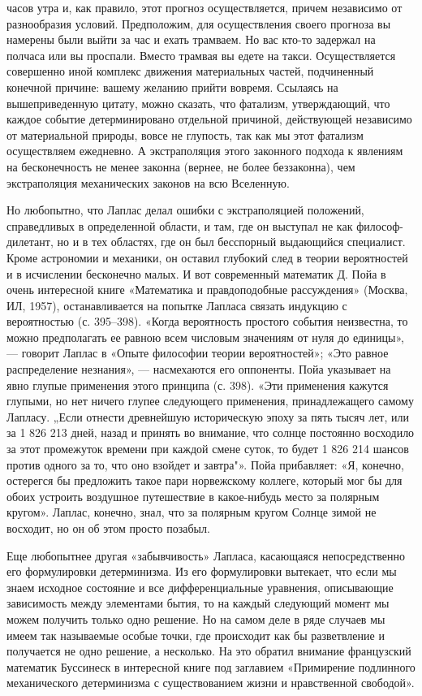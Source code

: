 часов  утра  и,  как  правило,  этот  прогноз  осуществляется,  причем
независимо  от разнообразия  условий.  Предположим, для  осуществления
своего прогноза вы намерены были выйти за час и ехать трамваем. Но вас
кто-то задержал на полчаса или вы проспали. Вместо трамвая вы едете на
такси. Осуществляется  совершенно иной комплекс  движения материальных
частей, подчиненный  конечной причине: вашему желанию  прийти вовремя.
Ссылаясь  на  вышеприведенную  цитату, можно  сказать,  что  фатализм,
утверждающий, что  каждое событие детерминировано  отдельной причиной,
действующей независимо от материальной природы, вовсе не глупость, так
как  мы этот  фатализм осуществляем  ежедневно. А  экстраполяция этого
законного  подхода  к  явлениям  на  бесконечность  не  менее  законна
(вернее, не более беззаконна),  чем экстраполяция механических законов
на всю Вселенную.

Но  любопытно, что  Лаплас  делал ошибки  с экстраполяцией  положений,
справедливых  в  определенной  области,  и там,  где  он  выступал  не
как  философ-дилетант, но  и в  тех  областях, где  он был  бесспорный
выдающийся  специалист.  Кроме  астрономии   и  механики,  он  оставил
глубокий след в теории вероятностей и в исчислении бесконечно малых. И
вот современный математик Д. Пойа в очень интересной книге «Математика
и правдоподобные  рассуждения» (Москва, ИЛ, 1957),  останавливается на
попытке Лапласа связать индукцию  с вероятностью (с. 395--398). «Когда
вероятность  простого события  неизвестна,  то  можно предполагать  ее
равною всем числовым значениям от нуля до единицы», --- говорит Лаплас
в  «Опыте философии  теории вероятностей»;  «Это равное  распределение
незнания»,  ---  насмехаются его  оппоненты.  Пойа  указывает на  явно
глупые  применения этого  принципа (с.  398). «Эти  применения кажутся
глупыми, но  нет ничего  глупее следующего  применения, принадлежащего
самому Лапласу.  „Если отнести  древнейшую историческую эпоху  за пять
тысяч лет,  или за 1  826 213 дней, назад  и принять во  внимание, что
солнце постоянно восходило за этот промежуток времени при каждой смене
суток, то будет 1 826 214 шансов  против одного за то, что оно взойдет
и  завтра"». Пойа  прибавляет:  «Я, конечно,  остерегся бы  предложить
такое  пари норвежскому  коллеге, который  мог бы  для обоих  устроить
воздушное  путешествие  в  какое-нибудь  место  за  полярным  кругом».
Лаплас,  конечно,  знал,  что  за  полярным  кругом  Солнце  зимой  не
восходит, но он об этом просто позабыл.

Еще    любопытнее    другая   «забывчивость»    Лапласа,    касающаяся
непосредственно  его формулировки  детерминизма.  Из его  формулировки
вытекает, что если мы знаем  исходное состояние и все дифференциальные
уравнения,  описывающие  зависимость  между элементами  бытия,  то  на
каждый следующий момент  мы можем получить только одно  решение. Но на
самом деле  в ряде случаев мы  имеем так называемые особые  точки, где
происходит  как  бы  разветвление  и получается  не  одно  решение,  а
несколько. На  это обратил внимание французский  математик Буссинеск в
интересной  книге под  заглавием «Примирение  подлинного механического
детерминизма с существованием жизни и нравственной свободой».

